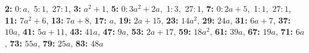 \textsf{\bfseries 2:} 0:\,$a$,\ 5:\,$1$,\ 27:\,$1$, \textsf{\bfseries 3:} $a^2 + 1$, \textsf{\bfseries 5:} 0:\,$3a^2 + 2a$,\ 1:\,$3$,\ 27:\,$1$, \textsf{\bfseries 7:} 0:\,$2a + 5$,\ 1:\,$1$,\ 27:\,$1$, \textsf{\bfseries 11:} $7a^2 + 6$, \textsf{\bfseries 13:} $7a + 8$, \textsf{\bfseries 17:} $a$, \textsf{\bfseries 19:} $2a + 15$, \textsf{\bfseries 23:} $14a^2$, \textsf{\bfseries 29:} $24a$, \textsf{\bfseries 31:} $6a + 7$, \textsf{\bfseries 37:} $10a$, \textsf{\bfseries 41:} $5a + 11$, \textsf{\bfseries 43:} $41a$, \textsf{\bfseries 47:} $9a$, \textsf{\bfseries 53:} $2a + 17$, \textsf{\bfseries 59:} $18a^2$, \textsf{\bfseries 61:} $39a$, \textsf{\bfseries 67:} $19a$, \textsf{\bfseries 71:} $6a$, \textsf{\bfseries 73:} $55a$, \textsf{\bfseries 79:} $25a$, \textsf{\bfseries 83:} $48a$